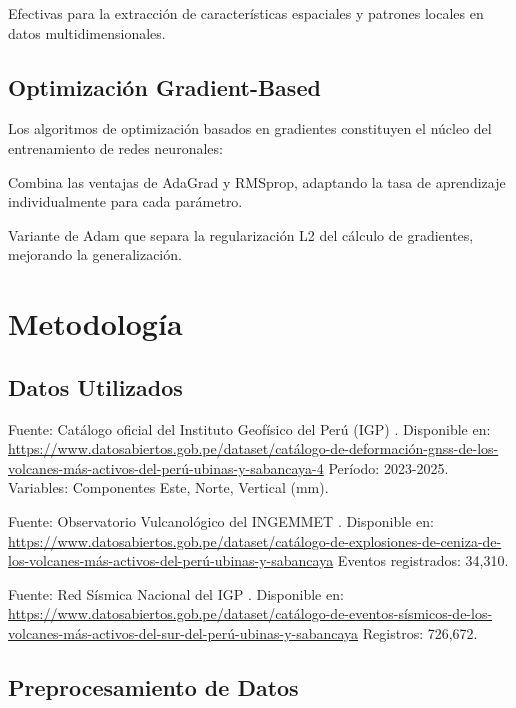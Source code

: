 \documentclass[11pt,a4paper]{article}
\begin{document}
 Efectivas para la extracción de características espaciales y patrones locales en datos multidimensionales.

\subsection{Optimización Gradient-Based}

Los algoritmos de optimización basados en gradientes constituyen el núcleo del entrenamiento de redes neuronales:

 Combina las ventajas de AdaGrad y RMSprop, adaptando la tasa de aprendizaje individualmente para cada parámetro.

 Variante de Adam que separa la regularización L2 del cálculo de gradientes, mejorando la generalización.

\section{Metodología}


\subsection{Datos Utilizados}

Fuente: Catálogo oficial del Instituto Geofísico del Perú (IGP) \citep{IGP2023GNSS}.  
Disponible en: \url{https://www.datosabiertos.gob.pe/dataset/catálogo-de-deformación-gnss-de-los-volcanes-más-activos-del-perú-ubinas-y-sabancaya-4}  
Período: 2023-2025.  
Variables: Componentes Este, Norte, Vertical (mm).  

Fuente: Observatorio Vulcanológico del INGEMMET \citep{INGEMMET2024Explosiones}.  
Disponible en: \url{https://www.datosabiertos.gob.pe/dataset/catálogo-de-explosiones-de-ceniza-de-los-volcanes-más-activos-del-perú-ubinas-y-sabancaya}  
Eventos registrados: 34,310.  

Fuente: Red Sísmica Nacional del IGP \citep{IGP2023Sismos}.  
Disponible en: \url{https://www.datosabiertos.gob.pe/dataset/catálogo-de-eventos-sísmicos-de-los-volcanes-más-activos-del-sur-del-perú-ubinas-y-sabancaya}  
Registros: 726,672.  

\subsection{Preprocesamiento de Datos}
\end{document}
